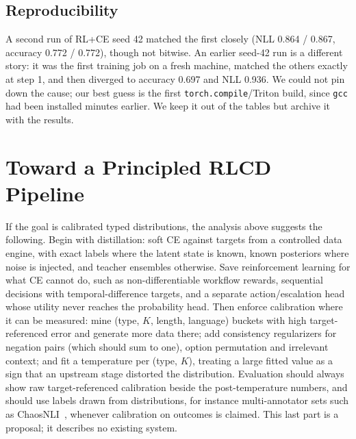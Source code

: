 \documentclass[conference]{IEEEtran}
\begin{document}
\begin{table}[t]
\caption{E6: zero-shot accuracy (\%) on recast classification tasks, base Laya vs our CE-only 1024/256 model, at two option-token budgets. $K$ is the number of options.}
\label{tab:recast}
\centering
\footnotesize
\setlength{\tabcolsep}{3pt}
\end{table}

\subsection{Reproducibility}
A second run of RL+CE seed 42 matched the first closely (NLL 0.864 / 0.867,
accuracy 0.772 / 0.772), though not bitwise. An earlier seed-42 run is a
different story: it was the first training job on a fresh machine, matched the
others exactly at step 1, and then diverged to accuracy 0.697 and NLL 0.936.
We could not pin down the cause; our best guess is the first
\texttt{torch.compile}/Triton build, since \texttt{gcc} had been installed
minutes earlier. We keep it out of the tables but archive it with the
results.

\section{Toward a Principled RLCD Pipeline}
\label{sec:principled}

If the goal is calibrated typed distributions, the analysis above suggests the
following. Begin with distillation: soft CE against targets from a controlled
data engine, with exact labels where the latent state is known, known
posteriors where noise is injected, and teacher ensembles otherwise. Save
reinforcement learning for what CE cannot do, such as non-differentiable
workflow rewards, sequential decisions with temporal-difference targets, and a
separate action/escalation head whose utility never reaches the probability
head. Then enforce calibration where it can be measured: mine (type, $K$,
length, language) buckets with high target-referenced error and generate more
data there; add consistency regularizers for negation pairs (which should sum
to one), option permutation and irrelevant context; and fit a temperature per
(type, $K$), treating a large fitted value as a sign that an upstream stage
distorted the distribution. Evaluation should always show raw
target-referenced calibration beside the post-temperature numbers, and should
use labels drawn from distributions, for instance multi-annotator sets such as
ChaosNLI~\cite{nie2020chaosnli}, whenever calibration on outcomes is claimed.
This last part is a proposal; it describes no existing system.
\end{document}

